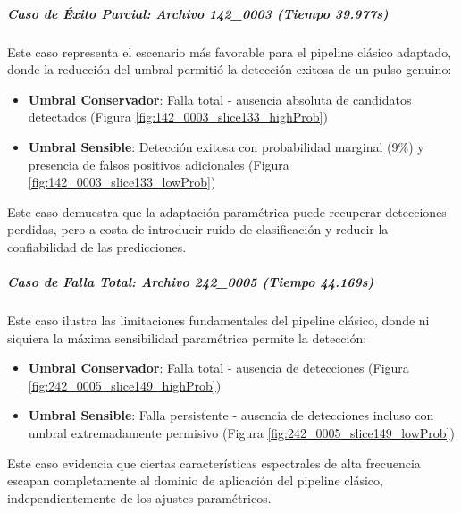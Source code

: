 \subparagraph{Caso de Éxito Parcial: Archivo 142\_0003 (Tiempo 39.977s)}

Este caso representa el escenario más favorable para el pipeline clásico adaptado, donde la reducción del umbral permitió la detección exitosa de un pulso genuino:

\begin{itemize}
    \item \textbf{Umbral Conservador}: Falla total - ausencia absoluta de candidatos detectados (Figura \ref{fig:142_0003_slice133_highProb})
    \item \textbf{Umbral Sensible}: Detección exitosa con probabilidad marginal (9\%) y presencia de falsos positivos adicionales (Figura \ref{fig:142_0003_slice133_lowProb})
\end{itemize}

Este caso demuestra que la adaptación paramétrica puede recuperar detecciones perdidas, pero a costa de introducir ruido de clasificación y reducir la confiabilidad de las predicciones.

\subparagraph{Caso de Falla Total: Archivo 242\_0005 (Tiempo 44.169s)}

Este caso ilustra las limitaciones fundamentales del pipeline clásico, donde ni siquiera la máxima sensibilidad paramétrica permite la detección:

\begin{itemize}
    \item \textbf{Umbral Conservador}: Falla total - ausencia de detecciones (Figura \ref{fig:242_0005_slice149_highProb})
    \item \textbf{Umbral Sensible}: Falla persistente - ausencia de detecciones incluso con umbral extremadamente permisivo (Figura \ref{fig:242_0005_slice149_lowProb})
\end{itemize}

Este caso evidencia que ciertas características espectrales de alta frecuencia escapan completamente al dominio de aplicación del pipeline clásico, independientemente de los ajustes paramétricos.

